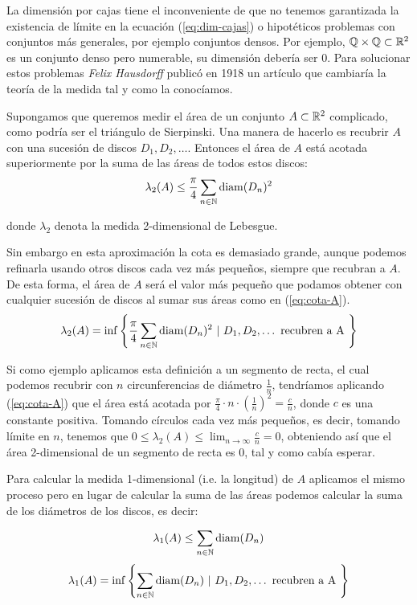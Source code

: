 La dimensión por cajas tiene el inconveniente de que no tenemos garantizada la existencia de límite en la ecuación (\ref{eq:dim-cajas}) o hipotéticos problemas con conjuntos más generales, por ejemplo conjuntos densos. Por ejemplo, $\mathbb{Q}\times\mathbb{Q}\subset\mathbb{R}^2$ es un conjunto denso pero numerable, su dimensión debería ser 0. Para solucionar estos problemas \textit{Felix Hausdorff} publicó en 1918 un artículo que cambiaría la teoría de la medida tal y como la conocíamos. 

Supongamos que queremos medir el área de un conjunto $A\subset\mathbb{R}^2$ complicado, como podría ser el triángulo de Sierpinski. Una manera de hacerlo es recubrir $A$ con una sucesión de discos $D_1,D_2,\dots$. Entonces el área de $A$ está acotada superiormente por la suma de las áreas de todos estos discos:
\begin{equation}\label{eq:cota-A}
\lambda_2(A)\leq \frac \pi 4 \sum_{n\in\mathbb{N}}\mathrm{diam}(D_n)^2
\end{equation}

donde $\lambda_2$ denota la medida 2-dimensional de Lebesgue.

Sin embargo en esta aproximación la cota es demasiado grande, aunque podemos refinarla usando otros discos cada vez más pequeños, siempre que recubran a $A$. De esta forma, el área de $A$ será el valor más pequeño que podamos obtener con cualquier sucesión de discos al sumar sus áreas como en (\ref{eq:cota-A}).
\begin{equation}
\lambda_2(A)=\inf\left\lbrace \frac \pi 4 \sum_{n\in\mathbb{N}}\mathrm{diam}(D_n)^2 \ | \  D_1,D_2,\dots \text{ recubren a A }\right\rbrace
\end{equation}

Si como ejemplo aplicamos esta definición a un segmento de recta, el cual podemos recubrir con $n$ circunferencias de diámetro $\frac 1 n$, tendríamos aplicando (\ref{eq:cota-A}) que el área está acotada por $\frac \pi 4 \cdot n \cdot \left(\frac 1 n\right)^2=\frac c n$, donde $c$ es una constante positiva. Tomando círculos cada vez más pequeños, es decir, tomando límite en $n$, tenemos que $0 \leq \lambda_2(A) \leq \lim_{n\rightarrow\infty}\frac c n = 0$, obteniendo así que el área 2-dimensional de un segmento de recta es 0, tal y como cabía esperar.

Para calcular la medida 1-dimensional (i.e. la longitud) de $A$ aplicamos el mismo proceso pero en lugar de calcular la suma de las áreas podemos calcular la suma de los diámetros de los discos, es decir:

$$
\lambda_1(A)\leq\sum_{n\in\mathbb{N}}\mathrm{diam}(D_n) 
$$
$$
\lambda_1(A)=\inf\left\lbrace \sum_{n\in\mathbb{N}}\mathrm{diam}(D_n) \ | \  D_1,D_2,\dots \text{ recubren a A }\right\rbrace 
$$

